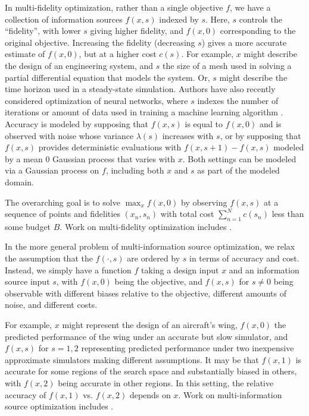 \documentclass{article}
\begin{document}
In multi-fidelity optimization, rather than a single objective $f$, we have a collection of information sources $f(x,s)$ indexed by $s$.  Here, $s$ controls the ``fidelity'', with lower $s$ giving higher fidelity, and $f(x,0)$ corresponding to the original objective.  Increasing the fidelity (decreasing $s$) gives a more accurate estimate of $f(x,0)$, but at a higher cost $c(s)$.  
For example, $x$ might describe the design of an engineering system, and $s$ the size of a mesh used in solving a partial differential equation that models the system.  Or, $s$ might describe the time horizon used in a steady-state simulation.  Authors have also recently considered optimization of neural networks, where $s$ indexes the number of iterations or amount of data used in training a machine learning algorithm \citep{swersky2014freeze,klein2016fast}.
Accuracy is modeled by supposing that $f(x,s)$ is equal to $f(x,0)$ and is observed with noise whose variance $\lambda(s)$ increases with $s$, or by supposing that $f(x,s)$ provides deterministic evaluations with $f(x,s+1)-f(x,s)$ modeled by a mean $0$ Gaussian process that varies with $x$.  Both settings can be modeled via a Gaussian process on $f$, including both $x$ and $s$ as part of the modeled domain.



The overarching goal is to solve $\max_x f(x,0)$ by observing $f(x,s)$ at a sequence of points and fidelities $(x_n,s_n)$ with total cost $\sum_{n=1}^N c(s_n)$ less than some budget $B$.  Work on multi-fidelity optimization includes \cite{HuAlNoMi06,SobesterLearyKeane2004,forrester2007multi,mcleod2017practical,kandasamy2016gaussian}.  

In the more general problem of multi-information source optimization, we relax the assumption that the $f(\cdot,s)$ are ordered by $s$ in terms of accuracy and cost.  Instead, we simply have a function $f$ taking a design input $x$ and an information source input $s$, with $f(x,0)$ being the objective, and $f(x,s)$ for $s\ne0$ being observable with different biases relative to the objective, different amounts of noise, and different costs.

For example, $x$ might represent the design of an aircraft's wing, $f(x,0)$ the predicted performance of the wing under an accurate but slow simulator, and $f(x,s)$ for $s=1,2$ representing predicted performance under two inexpensive approximate simulators making different assumptions.  It may be that $f(x,1)$ is accurate for some regions of the search space and substantially biased in others, with $f(x,2)$ being accurate in other regions.  In this setting, the relative accuracy of $f(x,1)$ vs. $f(x,2)$ depends on $x$.  Work on multi-information source optimization includes \cite{lam2015multifidelity,poloczek2017multi}.
\end{document}
